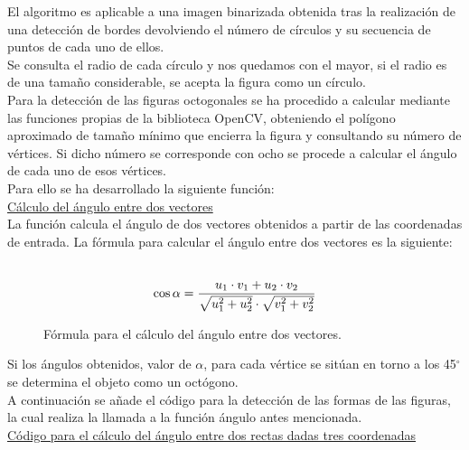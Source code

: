 El algoritmo es aplicable a una imagen binarizada obtenida tras la realización de una detección de bordes devolviendo el número de círculos y su secuencia de puntos de cada uno de ellos.\\

Se consulta el radio de cada círculo y nos quedamos con el mayor, si el radio es de una tamaño considerable, se acepta la figura como un círculo.\\

Para la detección de las figuras octogonales se ha procedido a calcular mediante las funciones propias de la biblioteca OpenCV, obteniendo el polígono aproximado de tamaño mínimo que encierra la figura y consultando su número de vértices. Si dicho número se corresponde con ocho se procede a calcular el ángulo de cada uno de esos vértices.\\

Para ello se ha desarrollado la siguiente función:\\

\underline{Cálculo del ángulo entre dos vectores}\\


La función calcula el ángulo de dos vectores obtenidos a partir de las coordenadas de entrada. La fórmula para calcular el ángulo entre dos vectores es la siguiente:\\\\

\begin{figure}[H]
  \begin{center}
    \[
      \cos \alpha = \frac{u_1 \cdot v_1 + u_2 \cdot v_2}{ \sqrt{u_1^2 + u_2^2} \cdot \sqrt{v_1^2 + v_2^2}}
      \nocite{}
    \]
  \end{center}
  \label{eq:angulo-vect}
  \caption{Fórmula para el cálculo del ángulo entre dos vectores.}
\end{figure}

Si los ángulos obtenidos, valor de $\alpha$, para cada vértice se sitúan en torno a los 45$^\circ$ se determina el objeto como un octógono.\\

A continuación se añade el código para la detección de las formas de las figuras, la cual realiza la llamada a la función ángulo antes mencionada.\\


\underline{Código para el cálculo del ángulo entre dos rectas dadas tres coordenadas}\\

